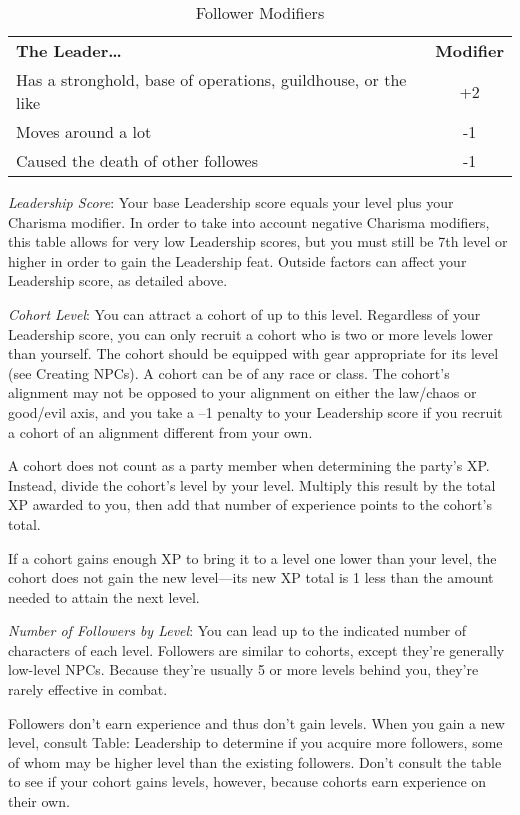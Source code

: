 \begin{table}[htb]
\sffamily
{}
\caption{Follower Modifiers}
\centering
\begin{tabular}{l c}
\textbf{The Leader\ldots{}} & \textbf{Modifier}\\
Has a stronghold, base of operations, guildhouse, or the like & +2\\
Moves around a lot & -1\\
Caused the death of other followes & -1\\
\end{tabular}
\end{table}
				
\textit{Leadership Score}: Your base Leadership score equals your level plus your Charisma modifier. In order to take into account negative Charisma modifiers, this table allows for very low Leadership scores, but you must still be 7th level or higher in order to gain the Leadership feat. Outside factors can affect your Leadership score, as detailed above.
				
\textit{Cohort Level}: You can attract a cohort of up to this level. Regardless of your Leadership score, you can only recruit a cohort who is two or more levels lower than yourself. The cohort should be equipped with gear appropriate for its level (see Creating NPCs). A cohort can be of any race or class. The cohort's alignment may not be opposed to your alignment on either the law/chaos or good/evil axis, and you take a --1 penalty to your Leadership score if you recruit a cohort of an alignment different from your own.\newline
				
A cohort does not count as a party member when determining the party's XP. Instead, divide the cohort's level by your level. Multiply this result by the total XP awarded to you, then add that number of experience points to the cohort's total.

If a cohort gains enough XP to bring it to a level one lower than your level, the cohort does not gain the new level---its new XP total is 1 less than the amount needed to attain the next level. 
				
\textit{Number of Followers by Level}: You can lead up to the indicated number of characters of each level. Followers are similar to cohorts, except they're generally low-level NPCs. Because they're usually 5 or more levels behind you, they're rarely effective in combat.
                
Followers don't earn experience and thus don't gain levels. When you gain a new level, consult Table: Leadership to determine if you acquire more followers, some of whom may be higher level than the existing followers. Don't consult the table to see if your cohort gains levels, however, because cohorts earn experience on their own.
				
